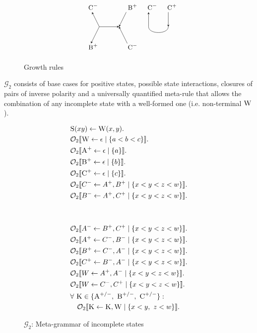 \documentclass[nonatbib,numbers,10pt]{llncs}
\newcommand\s{\textsc}
\newcommand{\Orderr}[5]{
	\mathcal{#1}_{#5}\llbracket #2 \leftarrow #3 \mid \{ #4 \} \rrbracket.
}
\newcommand{\Or}[4]{\Orderr{O}{#1}{#2}{#3}{#4}}
\begin{document}
\begin{figure}
\[\begin{tikzpicture}
\node (i33) at (7,-5) {$\textsc{\small C}^-$};
\node (ii33) at (9,-5) {$\textsc{\small B}^+$};
\node (d33) at (7.5,-6) {};
\node (dd33) at (8.5,-6) {};
\node (o33) at (7,-7) {$\textsc{\small B}^+$};
\node (oo33) at (9,-7) {$\textsc{\small C}^-$};
\draw[<-,>=stealth] (i33) -- (d33.center);
\draw[->,>=stealth] (ii33) -- (dd33.center);
\draw[->,>=stealth] (d33.center) -- (dd33.center);
\draw[->,>=stealth, shorten >=5pt] (d33.center) -- (o33.center);
\draw[<-,>=stealth, shorten >=5pt] (dd33.center) -- (oo33.center);

\node (i34) at (10,-5) {$\textsc{\small C}^-$};
\node (ii34) at (11,-5) {$\textsc{\small C}^+$};
\node (d34) at (10,-6) {};
\node (dd34) at (11,-6) {};\draw[<-,>=stealth] (i34) -- (d34.center);
\draw[->,>=stealth] (ii34) -- (dd34.center);
\draw (d34.center) edge [-,>=stealth,bend right=90] (dd34.center);

\end{tikzpicture}
\]
\caption{Growth rules}
\label{fig:rules}
\end{figure}

$\mathcal{G}_2$ consists of base cases for positive states, possible state interactions, closures of pairs of inverse polarity and a universally quantified meta-rule that allows the combination of any incomplete state with a well-formed one (i.e. non-terminal $\s{W}$).
\begin{figure}
    \centering
		\begin{minipage}{.2\textwidth}
		\begin{align*}
		&\s{S}(xy) \leftarrow \s{W}(x,y). \\
		&\Or{\s{W}}{\epsilon}{a < b < c}{2} \\
		&\Or{\s{A}^+}{\epsilon}{a}{2} \\
		&\Or{\s{B}^+}{\epsilon}{b}{2} \\
		&\Or{\s{C}^+}{\epsilon}{c}{2} \\
		&\Or{C^-}{A^+, B^+}{x < y < z < w}{2} \\
		&\Or{B^-}{A^+, C^+}{x < y < z < w}{2}
		\end{align*}
		\end{minipage}
~ ~ ~ ~ ~ ~
	    \begin{minipage}{.2\textwidth}
		\begin{align*}
		&\Or{A^-}{B^+, C^+}{x < y < z < w}{2} \\
		&\Or{A^+}{C^-, B^-}{x < y < z < w}{2} \\
		&\Or{B^+}{C^-, A^-}{x < y < z < w}{2} \\
		&\Or{C^+}{B^-, A^-}{x < y < z < w}{2} \\
		&\Or{W}{A^+, A^-}{x < y < z < w}{2} \\
		&\Or{W}{C^-, C^+}{x < y < z < w}{2} \\
		&\forall \ \s{K} \in \{\textsc{A}^{+/-},\ \textsc{B}^{+/-},\ \textsc{C}^{+/-}\}:\\ 
		&\quad\Or{\s{K}}{\s{K}, \s{W}}{x < y,\ z < w}{2}
		\end{align*}
		\end{minipage}
    \caption{$\mathcal{G}_2$: Meta-grammar of incomplete states}%
    \label{fig:g2}
\end{figure}
\end{document}
